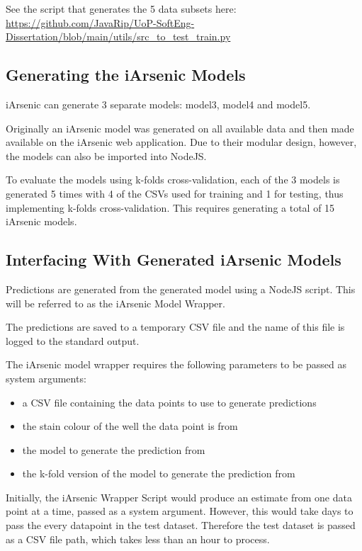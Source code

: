 See the script that generates the 5 data subsets here: \url{https://github.com/JavaRip/UoP-SoftEng-Dissertation/blob/main/utils/src_to_test_train.py}

\subsection{Generating the iArsenic Models}

iArsenic can generate 3 separate models: model3, model4 and model5.

Originally an iArsenic model was generated on all available data and then made available on the iArsenic web application. Due to their modular design, however, the models can also be imported into NodeJS.

To evaluate the models using k-folds cross-validation, each of the 3 models is generated 5 times with 4 of the CSVs used for training and 1 for testing, thus implementing k-folds cross-validation. This requires generating a total of 15 iArsenic models.

\subsection{Interfacing With Generated iArsenic Models}

Predictions are generated from the generated model using a NodeJS script. This will be referred to as the iArsenic Model Wrapper.

The predictions are saved to a temporary CSV file and the name of this file is logged to the standard output.

The iArsenic model wrapper requires the following parameters to be passed as system arguments:
\begin{itemize}
  \item a CSV file containing the data points to use to generate predictions
  \item the stain colour of the well the data point is from
  \item the model to generate the prediction from
  \item the k-fold version of the model to generate the prediction from
\end{itemize}

Initially, the iArsenic Wrapper Script would produce an estimate from one data point at a time, passed as a system argument. However, this would take days to pass the every datapoint in the test dataset. Therefore the test dataset is passed as a CSV file path, which takes less than an hour to process.

